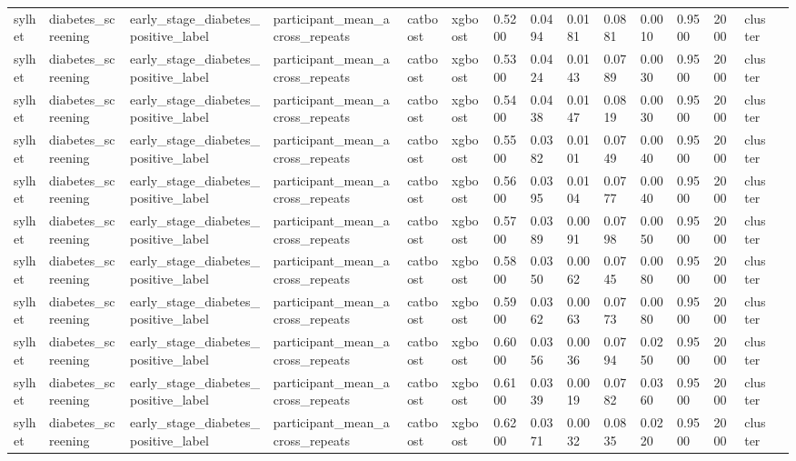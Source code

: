 \begin{tabular}{lllllllllllllll}
sylhet & diabetes\_screening & early\_stage\_diabetes\_positive\_label & participant\_mean\_across\_repeats & catboost & xgboost & 0.5200 & 0.0494 & 0.0181 & 0.0881 & 0.0010 & 0.9500 & 2000 & cluster &  \\
sylhet & diabetes\_screening & early\_stage\_diabetes\_positive\_label & participant\_mean\_across\_repeats & catboost & xgboost & 0.5300 & 0.0424 & 0.0143 & 0.0789 & 0.0030 & 0.9500 & 2000 & cluster &  \\
sylhet & diabetes\_screening & early\_stage\_diabetes\_positive\_label & participant\_mean\_across\_repeats & catboost & xgboost & 0.5400 & 0.0438 & 0.0147 & 0.0819 & 0.0030 & 0.9500 & 2000 & cluster &  \\
sylhet & diabetes\_screening & early\_stage\_diabetes\_positive\_label & participant\_mean\_across\_repeats & catboost & xgboost & 0.5500 & 0.0382 & 0.0101 & 0.0749 & 0.0040 & 0.9500 & 2000 & cluster &  \\
sylhet & diabetes\_screening & early\_stage\_diabetes\_positive\_label & participant\_mean\_across\_repeats & catboost & xgboost & 0.5600 & 0.0395 & 0.0104 & 0.0777 & 0.0040 & 0.9500 & 2000 & cluster &  \\
sylhet & diabetes\_screening & early\_stage\_diabetes\_positive\_label & participant\_mean\_across\_repeats & catboost & xgboost & 0.5700 & 0.0389 & 0.0091 & 0.0798 & 0.0050 & 0.9500 & 2000 & cluster &  \\
sylhet & diabetes\_screening & early\_stage\_diabetes\_positive\_label & participant\_mean\_across\_repeats & catboost & xgboost & 0.5800 & 0.0350 & 0.0062 & 0.0745 & 0.0080 & 0.9500 & 2000 & cluster &  \\
sylhet & diabetes\_screening & early\_stage\_diabetes\_positive\_label & participant\_mean\_across\_repeats & catboost & xgboost & 0.5900 & 0.0362 & 0.0063 & 0.0773 & 0.0080 & 0.9500 & 2000 & cluster &  \\
sylhet & diabetes\_screening & early\_stage\_diabetes\_positive\_label & participant\_mean\_across\_repeats & catboost & xgboost & 0.6000 & 0.0356 & 0.0036 & 0.0794 & 0.0250 & 0.9500 & 2000 & cluster &  \\
sylhet & diabetes\_screening & early\_stage\_diabetes\_positive\_label & participant\_mean\_across\_repeats & catboost & xgboost & 0.6100 & 0.0339 & 0.0019 & 0.0782 & 0.0360 & 0.9500 & 2000 & cluster &  \\
sylhet & diabetes\_screening & early\_stage\_diabetes\_positive\_label & participant\_mean\_across\_repeats & catboost & xgboost & 0.6200 & 0.0371 & 0.0032 & 0.0835 & 0.0220 & 0.9500 & 2000 & cluster &  \\

\end{tabular}
